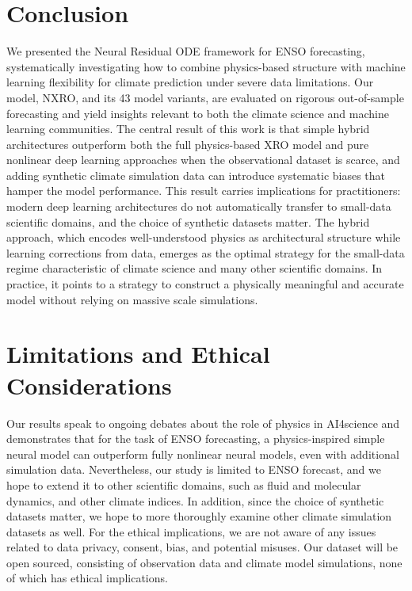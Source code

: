 \section{Conclusion}
\label{sec:conclusion}

We presented the Neural Residual ODE framework for ENSO forecasting, systematically investigating how to combine physics-based structure with machine learning flexibility for climate prediction under severe data limitations. Our model, NXRO, and its 43 model variants, are evaluated on rigorous out-of-sample forecasting and yield insights relevant to both the climate science and machine learning communities. The central result of this work is that simple hybrid architectures outperform both the full physics-based XRO model and pure nonlinear deep learning approaches when the observational dataset is scarce, and adding synthetic climate simulation data can introduce systematic biases that hamper the model performance. This result carries implications for practitioners: modern deep learning architectures do not automatically transfer to small-data scientific domains, and the choice of synthetic datasets matter. The hybrid approach, which encodes well-understood physics as architectural structure while learning corrections from data, emerges as the optimal strategy for the small-data regime characteristic of climate science and many other scientific domains. In practice, it points to a strategy to construct a physically meaningful and accurate model without relying on massive scale simulations. %


\section{Limitations and Ethical Considerations}

Our results speak to ongoing debates about the role of physics in AI4science and demonstrates that for the task of ENSO forecasting, a physics-inspired simple neural model can outperform fully nonlinear neural models, even with additional simulation data. Nevertheless, our study is limited to ENSO forecast, and we hope to extend it to other scientific domains, such as fluid and molecular dynamics, and other climate indices. In addition, since the choice of synthetic datasets matter, we hope to more thoroughly examine other climate simulation datasets as well. For the ethical implications, we are not aware of any issues related to data privacy, consent, bias, and potential misuses. Our dataset will be open sourced, consisting of observation data and climate model simulations, none of which has ethical implications. 